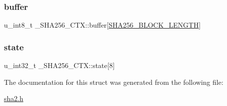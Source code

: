 \subsubsection{\texorpdfstring{buffer}{buffer}}
{\footnotesize\ttfamily u\+\_\+int8\+\_\+t \+\_\+\+S\+H\+A256\+\_\+\+C\+T\+X\+::buffer\mbox{[}\mbox{\hyperlink{sha2_8h_af7a1879c2d7cd5cf31c91c0eb91b0015}{S\+H\+A256\+\_\+\+B\+L\+O\+C\+K\+\_\+\+L\+E\+N\+G\+TH}}\mbox{]}}

\mbox{\label{struct__SHA256__CTX_a8d0de581b0873919d65864ad0df17ad5}} 
\subsubsection{\texorpdfstring{state}{state}}
{\footnotesize\ttfamily u\+\_\+int32\+\_\+t \+\_\+\+S\+H\+A256\+\_\+\+C\+T\+X\+::state\mbox{[}8\mbox{]}}



The documentation for this struct was generated from the following file\+:\begin{DoxyCompactItemize}
\item 
\mbox{\hyperlink{sha2_8h}{sha2.\+h}}\end{DoxyCompactItemize}
